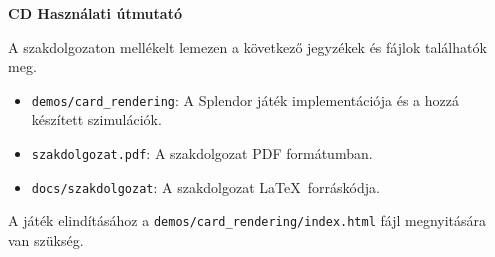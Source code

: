 \pagestyle{empty}

\noindent \textbf{\Large CD Használati útmutató}

\vskip 1cm

\noindent A szakdolgozaton mellékelt lemezen a következő jegyzékek és fájlok találhatók meg.

\begin{itemize}
	\item \texttt{demos/card\_rendering}: A Splendor játék implementációja és a hozzá készített szimulációk.
	\item \texttt{szakdolgozat.pdf}: A szakdolgozat PDF formátumban.
	\item \texttt{docs/szakdolgozat}: A szakdolgozat \LaTeX\ forráskódja.
\end{itemize}

\bigskip

\noindent A játék elindításához a \texttt{demos/card\_rendering/index.html} fájl megnyitására van szükség.